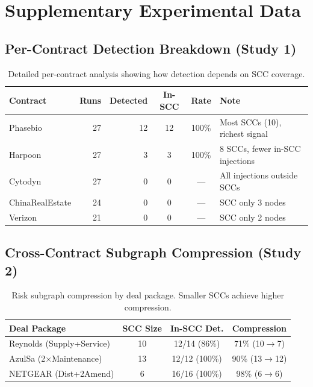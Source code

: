 \documentclass{article}
\begin{document}
\newpage
\appendix

\section{Supplementary Experimental Data}

\subsection{Per-Contract Detection Breakdown (Study 1)}

\begin{table}[h]
\caption{Detailed per-contract analysis showing how detection depends on SCC coverage.}
\centering
\small
\begin{tabular}{lrrccl}
\toprule
\textbf{Contract} & \textbf{Runs} & \textbf{Detected} & \textbf{In-SCC} & \textbf{Rate} & \textbf{Note} \\
\midrule
Phasebio & 27 & 12 & 12 & 100\% & Most SCCs (10), richest signal \\
Harpoon & 27 & 3 & 3 & 100\% & 8 SCCs, fewer in-SCC injections \\
Cytodyn & 27 & 0 & 0 & --- & All injections outside SCCs \\
ChinaRealEstate & 24 & 0 & 0 & --- & SCC only 3 nodes \\
Verizon & 21 & 0 & 0 & --- & SCC only 2 nodes \\
\bottomrule
\end{tabular}
\end{table}

\subsection{Cross-Contract Subgraph Compression (Study 2)}

\begin{table}[h]
\caption{Risk subgraph compression by deal package. Smaller SCCs achieve higher compression.}
\centering
\small
\begin{tabular}{lccc}
\toprule
\textbf{Deal Package} & \textbf{SCC Size} & \textbf{In-SCC Det.} & \textbf{Compression} \\
\midrule
Reynolds (Supply+Service) & 10 & 12/14 (86\%) & 71\% (10$\to$7) \\
AzulSa (2$\times$Maintenance) & 13 & 12/12 (100\%) & 90\% (13$\to$12) \\
NETGEAR (Dist+2Amend) & 6 & 16/16 (100\%) & 98\% (6$\to$6) \\
\bottomrule
\end{tabular}
\end{table}
\end{document}
